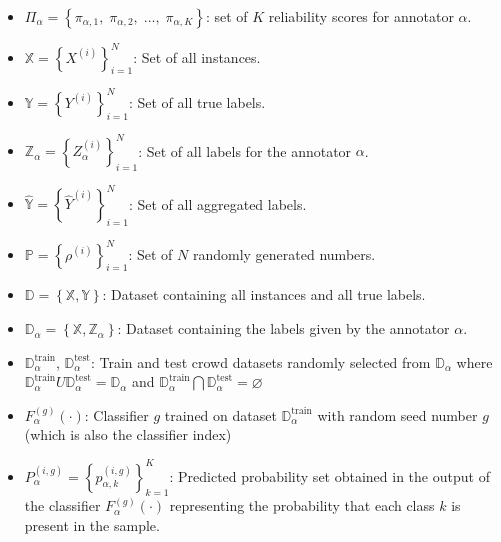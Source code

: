 \begin{itemize}
    \item  ${\Pi}_\alpha=\left\{\pi_{\alpha,1},\;\pi_{\alpha,2},\;\dots,\;\pi_{\alpha,K}\right\} $: set of $K $ reliability scores for annotator $\alpha $.

    \item  $\mathbb{X} = {\left\{X^{(i)}\right\}}_{i=1}^{N} $: Set of all instances.

    \item  $\mathbb{Y} = {\left\{Y^{(i)}\right\}}_{i=1}^{N} $: Set of all true labels.

    \item  $\mathbb{Z}_\alpha = {\left\{Z_\alpha^{(i)}\right\}}_{i=1}^{N} $: Set of all labels for the annotator $\alpha $.

    \item  $\widehat{\mathbb{Y}} = {\left\{\widehat{Y}^{(i)}\right\}}_{i=1}^{N} $: Set of all aggregated labels.

    \item  $\mathbb{P} = {\left\{\rho^{(i)}\right\}}_{i=1}^{N} $: Set of $N $ randomly generated numbers.

    \item  $\mathbb{D}=\left\{\mathbb{X},\mathbb{Y}\right\} $: Dataset containing all instances and all true labels.

    \item  $\mathbb{D}_\alpha=\left\{\mathbb{X},\mathbb{Z}_\alpha\right\} $: Dataset containing the labels given by the annotator $\alpha $.

    \item  $\mathbb{D}_\alpha^\text{train}$, $\mathbb{D}_\alpha^{\text{test}} $: Train and test crowd datasets randomly selected from $\mathbb{D}_{\alpha} $ where $\mathbb{D}_\alpha^{\text{train}} U \mathbb{D}_\alpha^{\text{test}} = \mathbb{D}_\alpha $ and $\mathbb{D}_\alpha^{\text{train}} \bigcap \mathbb{D}_{\alpha}^{\text{test}}=\varnothing $

    \item  $F_{\alpha}^{(g)}(\cdot)$: Classifier $g $ trained on dataset $\mathbb{D}_{\alpha}^{\mathrm{train}} $ with random seed number $g $ (which is also the classifier index)

    \item  $P_{\alpha}^{(i,g)} = {\left\{ p_{\alpha,k}^{(i,g)} \right\}}_{k=1}^{K} $: Predicted probability set obtained in the output of the classifier $F_{\alpha}^{(g)}(\cdot) $ representing the probability that each class $k $ is present in the sample.


\end{itemize}
